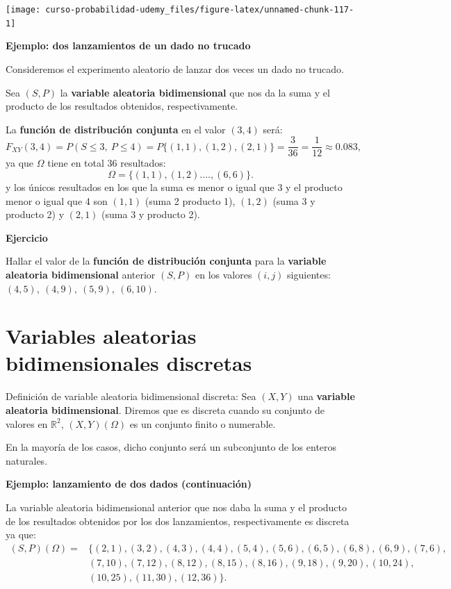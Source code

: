 \documentclass[]{book}
\begin{document}
\begin{center}\texttt{[image: curso-probabilidad-udemy\_files/figure-latex/unnamed-chunk-117-1]} \end{center}

\textbf{Ejemplo: dos lanzamientos de un dado no trucado}

Consideremos el experimento aleatorio de lanzar dos veces un dado no trucado.

Sea \((S,P)\) la \textbf{variable aleatoria bidimensional} que nos da la suma y el producto de los resultados obtenidos, respectivamente.

La \textbf{función de distribución conjunta} en el valor \((3,4)\) será:
\[
F_{XY}(3,4) = P(S\leq 3,\ P\leq 4)=P\{(1,1), (1,2), (2,1) \}=\frac{3}{36}=\frac{1}{12}\approx 0.083, 
\]
ya que \(\Omega\) tiene en total \(36\) resultados:
\[
\Omega =\{(1,1),(1,2).\ldots, (6,6)\}.
\]
y los únicos resultados en los que la suma es menor o igual que 3 y el producto menor o igual que 4 son \((1,1)\) (suma 2 producto 1), \((1,2)\) (suma 3 y producto 2) y \((2,1)\) (suma 3 y producto 2).

\textbf{Ejercicio}

Hallar el valor de la \textbf{función de distribución conjunta} para la \textbf{variable aleatoria bidimensional} anterior \((S,P)\) en los valores \((i,j)\) siguientes: \((4,5),\ (4,9),\ (5,9),\ (6,10)\).

\hypertarget{variables-aleatorias-bidimensionales-discretas}{%
\section{Variables aleatorias bidimensionales discretas}\label{variables-aleatorias-bidimensionales-discretas}}

Definición de variable aleatoria bidimensional discreta:
Sea \((X,Y)\) una \textbf{variable aleatoria bidimensional}. Diremos
que es discreta cuando su conjunto de valores en \(\mathbb{R}^2\), \((X,Y)(\Omega)\) es un conjunto finito o numerable.

En la mayoría de los casos, dicho conjunto será un subconjunto de los enteros naturales.

\textbf{Ejemplo: lanzamiento de dos dados (continuación)}

La variable aleatoria bidimensional anterior que nos daba la suma y el producto de los resultados obtenidos por los dos lanzamientos, respectivamente es discreta ya que:
\[
\begin{array}{rl}
(S,P)(\Omega) =&\{(2,1),(3,2),(4,3),(4,4),(5,4),(5,6),(6,5),(6,8),(6,9),(7,6),\\ & 
(7,10),(7,12),(8,12), (8,15),(8,16),(9,18),(9,20),(10,24),\\ & (10,25),(11,30), (12,36)\}.
\end{array}
\]
\end{document}
